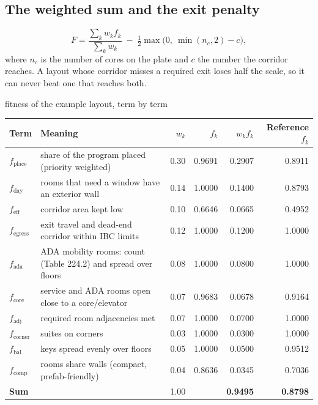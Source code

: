 \documentclass[10pt,a4paper]{article}
\begin{document}
\subsection{The weighted sum and the exit penalty}
\[ F = \frac{\sum_k w_k f_k}{\sum_k w_k} \; - \; \tfrac12 \max\!\big(0,\ \min(n_c, 2) - c\big), \]
where $n_c$ is the number of cores on the plate and $c$ the number the corridor reaches. A layout whose corridor
misses a required exit loses half the scale, so it can never beat one that reaches both.

\begin{example}{fitness of the example layout, term by term}
\begin{center}\centering\small
\begin{tabular}{@{}l p{6.2cm} r r r r@{}}
\toprule
\textbf{Term} & \textbf{Meaning} & \textbf{$w_k$} & \textbf{$f_k$} & \textbf{$w_k f_k$} & \textbf{Reference $f_k$} \\ \midrule
$f_{\text{place}}$ & share of the program placed (priority weighted) & 0.30 & 0.9691 & 0.2907 & 0.8911 \\
$f_{\text{day}}$ & rooms that need a window have an exterior wall & 0.14 & 1.0000 & 0.1400 & 0.8793 \\
$f_{\text{eff}}$ & corridor area kept low & 0.10 & 0.6646 & 0.0665 & 0.4952 \\
$f_{\text{egress}}$ & exit travel and dead-end corridor within IBC limits & 0.12 & 1.0000 & 0.1200 & 1.0000 \\
$f_{\text{ada}}$ & ADA mobility rooms: count (Table 224.2) and spread over floors & 0.08 & 1.0000 & 0.0800 & 1.0000 \\
$f_{\text{core}}$ & service and ADA rooms open close to a core/elevator & 0.07 & 0.9683 & 0.0678 & 0.9164 \\
$f_{\text{adj}}$ & required room adjacencies met & 0.07 & 1.0000 & 0.0700 & 1.0000 \\
$f_{\text{corner}}$ & suites on corners & 0.03 & 1.0000 & 0.0300 & 1.0000 \\
$f_{\text{bal}}$ & keys spread evenly over floors & 0.05 & 1.0000 & 0.0500 & 0.9512 \\
$f_{\text{comp}}$ & rooms share walls (compact, prefab-friendly) & 0.04 & 0.8636 & 0.0345 & 0.7036 \\
\midrule \textbf{Sum} &  & 1.00 &  & \textbf{0.9495} & \textbf{0.8798} \\
\bottomrule
\end{tabular}
\end{center}
\begin{itemize}

\end{itemize}
\end{example}
\end{document}
